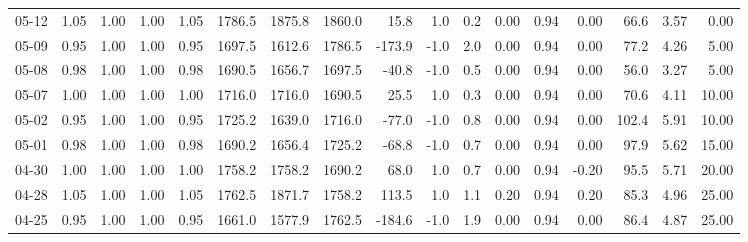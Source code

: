 \begin{threeparttable}
{\begin{tabular}{lrrrrrrrrrrrrrrrr}
  05-12 &         1.05 &           1.00 &          1.00 &          1.05 & 1786.5 & 1875.8 & 1860.0 &       15.8 &                      1.0 &                 0.2 &       0.00 &      0.94 &           0.00 &             66.6 &            3.57 &                   0.00 \\
  05-09 &         0.95 &           1.00 &          1.00 &          0.95 & 1697.5 & 1612.6 & 1786.5 &     -173.9 &                     -1.0 &                 2.0 &       0.00 &      0.94 &           0.00 &             77.2 &            4.26 &                   5.00 \\
  05-08 &         0.98 &           1.00 &          1.00 &          0.98 & 1690.5 & 1656.7 & 1697.5 &      -40.8 &                     -1.0 &                 0.5 &       0.00 &      0.94 &           0.00 &             56.0 &            3.27 &                   5.00 \\
  05-07 &         1.00 &           1.00 &          1.00 &          1.00 & 1716.0 & 1716.0 & 1690.5 &       25.5 &                      1.0 &                 0.3 &       0.00 &      0.94 &           0.00 &             70.6 &            4.11 &                  10.00 \\
  05-02 &         0.95 &           1.00 &          1.00 &          0.95 & 1725.2 & 1639.0 & 1716.0 &      -77.0 &                     -1.0 &                 0.8 &       0.00 &      0.94 &           0.00 &            102.4 &            5.91 &                  10.00 \\
  05-01 &         0.98 &           1.00 &          1.00 &          0.98 & 1690.2 & 1656.4 & 1725.2 &      -68.8 &                     -1.0 &                 0.7 &       0.00 &      0.94 &           0.00 &             97.9 &            5.62 &                  15.00 \\
  04-30 &         1.00 &           1.00 &          1.00 &          1.00 & 1758.2 & 1758.2 & 1690.2 &       68.0 &                      1.0 &                 0.7 &       0.00 &      0.94 &          -0.20 &             95.5 &            5.71 &                  20.00 \\
  04-28 &         1.05 &           1.00 &          1.00 &          1.05 & 1762.5 & 1871.7 & 1758.2 &      113.5 &                      1.0 &                 1.1 &       0.20 &      0.94 &           0.20 &             85.3 &            4.96 &                  25.00 \\
  04-25 &         0.95 &           1.00 &          1.00 &          0.95 & 1661.0 & 1577.9 & 1762.5 &     -184.6 &                     -1.0 &                 1.9 &       0.00 &      0.94 &           0.00 &             86.4 &            4.87 &                  25.00 \\

\end{tabular}}
\end{threeparttable}
